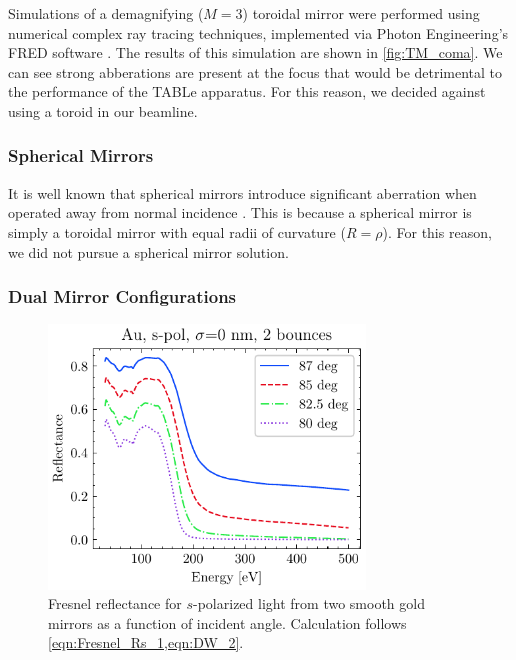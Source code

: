 Simulations of a demagnifying ($M=3$) toroidal mirror were performed using numerical complex ray tracing techniques, implemented via Photon Engineering's FRED software \cite{FREDOpticalEngineering,arnaudRepresentationGaussianBeams1985}. The results of this simulation are shown in \cref{fig:TM_coma}. We can see strong abberations are present at the focus that would be detrimental to the performance of the TABLe apparatus. For this reason, we decided against using a toroid in our beamline.

\subsubsection{Spherical Mirrors}

It is well known that spherical mirrors introduce significant aberration when operated away from normal incidence \cite{howellsMirrorsSynchrotronRadiationBeamlines1994}. This is because a spherical mirror is simply a toroidal mirror with equal radii of curvature ($R=\rho$). For this reason, we did not pursue a spherical mirror solution.

\subsubsection{Dual Mirror Configurations}

\begin{figure}
	\centering
	\includegraphics[width=0.75\textwidth]{figures/chap2/Au_ReflvsAngle_2bounce.pdf}
	\caption{Fresnel reflectance for $s$-polarized light from two smooth gold mirrors as a function of incident angle. Calculation follows \cref{eqn:Fresnel_Rs_1,eqn:DW_2}.}
	\label{fig:Au_ReflvsAngle_2bounce}
\end{figure}

